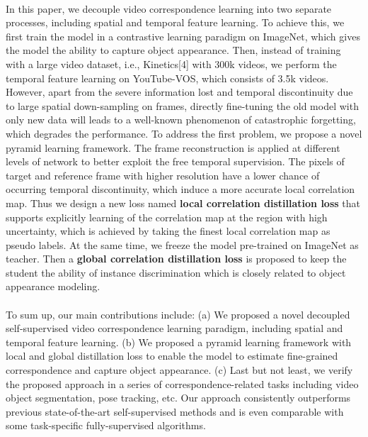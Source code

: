 \documentclass{article}
\begin{document}
\\
In this paper, we decouple video correspondence learning into two separate processes, including spatial and temporal feature learning. To achieve this, we first train the model in a contrastive learning paradigm on ImageNet, which gives the model the ability to capture object appearance. Then, instead of training with a large video dataset, i.e., Kinetics[4] with 300k videos, we perform the temporal feature learning on YouTube-VOS, which consists of 3.5k videos. However, apart from the severe  information lost and temporal discontinuity due to large spatial down-sampling on frames, directly fine-tuning the old model with only new data will leads to a well-known phenomenon of catastrophic forgetting, which degrades the performance. To address the first problem, we propose a novel pyramid learning framework. The frame reconstruction is applied at different levels of network to better exploit the free temporal supervision. The pixels of target and reference frame with higher resolution have a lower chance of occurring temporal discontinuity, which induce a more accurate local correlation map. Thus we design a new loss named \textbf{local correlation distillation loss} that supports explicitly learning of the correlation map at the region with high uncertainty, which is achieved by taking the finest local correlation map as pseudo labels. At the same time, we freeze the model pre-trained on ImageNet as teacher. Then a \textbf{global correlation distillation loss} is proposed to keep the student the ability of instance discrimination which is closely related to object appearance modeling. \\
\\
To sum up, our main contributions include: (a) We proposed a novel decoupled self-supervised video correspondence learning paradigm, including spatial and temporal feature learning. (b) We proposed a pyramid learning framework with local and global distillation loss to enable the model to estimate fine-grained correspondence and capture object appearance. (c) Last but not least, we verify the proposed approach in a series of correspondence-related tasks including video object segmentation, pose tracking, etc. Our approach consistently outperforms previous state-of-the-art self-supervised methods and is even comparable with some task-specific fully-supervised algorithms.
\end{document}

